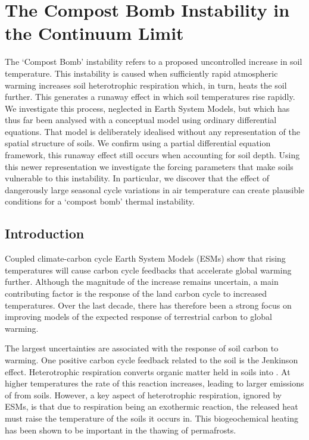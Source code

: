 \chapter{The Compost Bomb Instability in the Continuum Limit}
\graphicspath{{continuous_compost_bomb/figs/}}

  The `Compost Bomb' instability refers to a proposed uncontrolled increase in soil temperature. This instability is caused when sufficiently rapid
  atmospheric warming increases soil heterotrophic respiration which, in turn, heats the soil further. This generates a runaway
  effect in which soil temperatures rise rapidly. We investigate this process, neglected in Earth System Models, but which has thus far been analysed with a conceptual
  model using ordinary differential equations. That model is deliberately idealised without any representation of the spatial structure of soils.
  We confirm using a partial differential equation framework, this runaway effect still occurs when accounting for soil depth.
  Using this newer representation we investigate the forcing parameters that make soils vulnerable to this instability. In particular, we discover that the effect of
  dangerously large seasonal cycle variations in air temperature can create plausible conditions for a `compost bomb' thermal instability.

 \section{Introduction}
\label{section:compost_bomb_intro}
Coupled climate-carbon cycle Earth System Models (ESMs) show that rising temperatures will cause carbon cycle feedbacks that accelerate global
warming further\cite{Cox2000}. Although the magnitude of the increase remains uncertain, a main contributing factor is the
response of the land carbon cycle to increased temperatures\cite{Friedlingstein2006,Arora2020}. Over the last decade, there has therefore been a strong focus on improving
models of the expected response of terrestrial carbon to global warming.

The largest uncertainties are associated with the response of soil carbon to warming\cite{Varney2020}.
One positive carbon cycle feedback related to the soil is the Jenkinson effect\cite{Jenkinson1991}. Heterotrophic respiration converts
organic matter held in soils into . At higher temperatures the rate of this reaction increases, leading to
larger emissions of  from soils. However, a key aspect of heterotrophic respiration, ignored by ESMs\cite{Arora2020}, is that due to respiration being
an exothermic reaction, the released heat must raise the temperature of the soils it occurs in. This biogeochemical heating has been shown
to be important in the thawing of permafrosts\cite{Khvorostyanov2008,Khvorostyanov2008a}.

